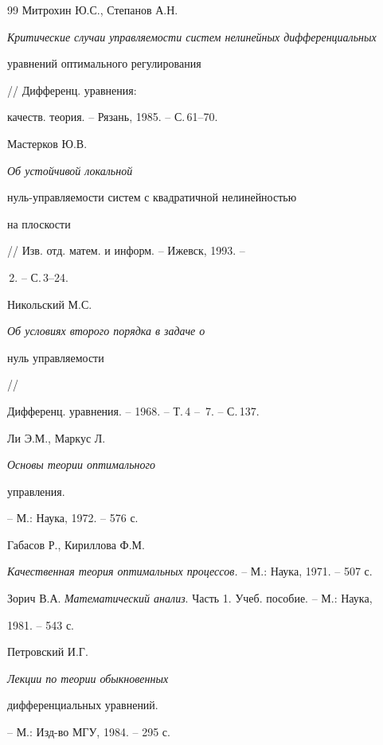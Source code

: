 \begin{thebibliography}{99}
Митрохин Ю.С., Степанов А.Н.


{\em Критические случаи управляемости систем нелинейных дифференциальных


уравнений оптимального регулирования} // Дифференц. уравнения:


качеств. теория. --  Рязань, 1985. -- С.\,61--70.




Мастерков Ю.В. {\em Об устойчивой локальной


нуль-управляемости систем с квадратичной нелинейностью


на плоскости} // Изв. отд. матем. и информ. -- Ижевск, 1993. --


\No\,2.  -- С.\,3--24.




Никольский М.С. {\em Об условиях второго порядка в задаче о


нуль управляемости} //


Дифференц. уравнения. -- 1968. -- Т.\,4 -- \No\,7. -- С.\,137.




Ли Э.М., Маркус Л. {\em Основы теории оптимального


управления.} -- М.: Наука, 1972. -- 576 с.




Габасов Р., Кириллова Ф.М.


{\em Качественная теория оптимальных процессов.} -- М.: Наука, 1971. -- 507 с.




Зорич В.А. {\em Математический анализ}. Часть 1. Учеб. пособие. -- М.: Наука,


1981.  -- 543 с.




Петровский И.Г. {\em Лекции по теории обыкновенных


дифференциальных уравнений.} -- М.: Изд-во МГУ, 1984. -- 295 с.





\end{thebibliography}





\vskip 2cm












\label{end}








